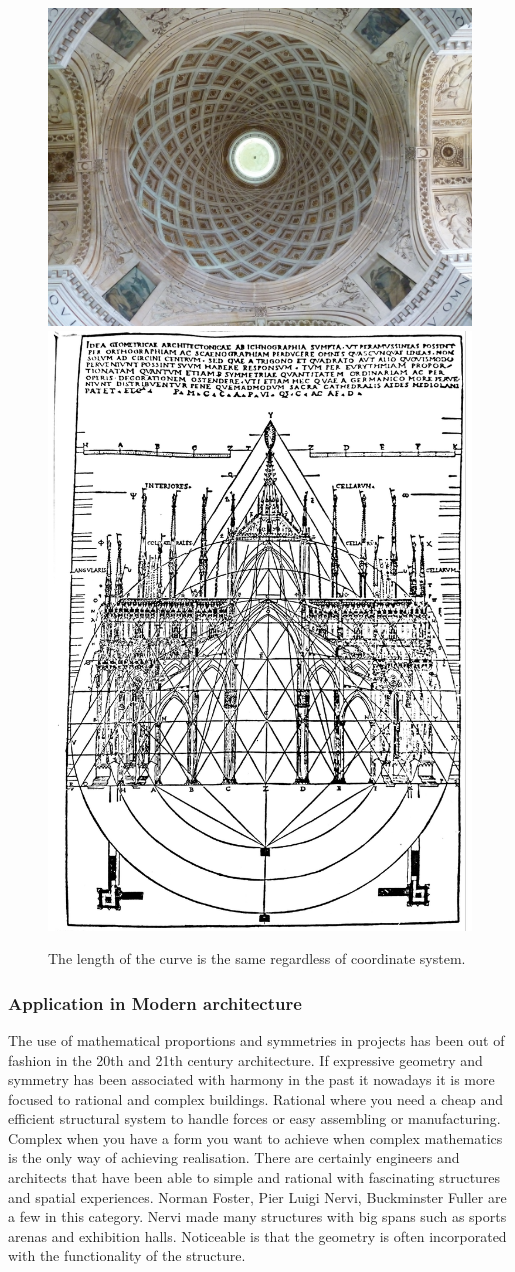 \begin{figure}[H]
\centering
\includegraphics[height=0.45\linewidth ]{figure/Introduction/PhillibertDeLorme.jpg}
\includegraphics[height=0.45\linewidth ]{figure/Introduction/Milan.pdf}
\caption{The length of the curve is the same regardless of coordinate system.}
\end{figure}

\subsubsection{Application in Modern architecture }
The use of mathematical proportions and symmetries in projects has been out of fashion in the 20th and 21th century architecture. If expressive geometry and symmetry has been associated with harmony in the past it nowadays it is more focused to rational and complex buildings. Rational where you need a cheap and efficient structural system to handle forces or easy assembling or manufacturing. Complex when you have a form you want to achieve when complex mathematics is the only way of achieving realisation. There are certainly engineers and architects that have been able to simple and rational with fascinating structures and spatial experiences. Norman Foster, Pier Luigi Nervi, Buckminster Fuller are a few in this category. Nervi made many structures with big spans such as sports arenas and exhibition halls. Noticeable is that the geometry is often incorporated with the functionality of the structure.


